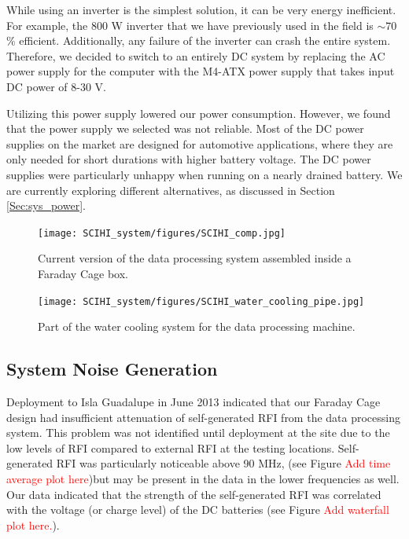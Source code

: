 While using an inverter is the simplest solution, it can be very energy inefficient. For example, the 800 W inverter that we have previously used in the field is $\sim70$\% efficient. Additionally, any failure of the inverter can crash the entire system. Therefore, we decided to switch to an entirely DC system by replacing the AC power supply for the computer with the M4-ATX power supply that takes input DC power of 8-30 V. 

Utilizing this power supply lowered our power consumption. However, we found that the power supply we selected was not reliable. Most of the DC power supplies on the market are designed for automotive applications, where they are only needed for short durations with higher battery voltage. The DC power supplies were particularly unhappy when running on a nearly drained battery. We are currently exploring different alternatives, as discussed in Section \ref{Sec:sys_power}. 

\begin{figure}[htb]
\centering
\begin{minipage}[b]{0.52\textwidth}
\centering
\texttt{[image: SCIHI\_system/figures/SCIHI\_comp.jpg]}
\caption{Current version of the data processing system assembled inside a Faraday Cage box.}
\label{Fig:new_comp}
\end{minipage}%
\begin{minipage}[b]{0.02\textwidth}
\hspace{1cm}
\end{minipage}%
\begin{minipage}[b]{0.42\textwidth}
\centering
\texttt{[image: SCIHI\_system/figures/SCIHI\_water\_cooling\_pipe.jpg]}
\caption{Part of the water cooling system for the data processing machine.}
\label{Fig:water_pipe}
\end{minipage}
\end{figure}

\subsection{System Noise Generation}
Deployment to Isla Guadalupe in June 2013 indicated that our Faraday Cage design had insufficient attenuation of self-generated RFI from the data processing system. This problem was not identified until deployment at the site due to the low levels of RFI compared to external RFI at the testing locations. Self-generated RFI was particularly noticeable above 90 MHz, (see Figure \textcolor{red}{Add time average plot here})but may be present in the data in the lower frequencies as well. Our data indicated that the strength of the self-generated RFI was correlated with the voltage (or charge level) of the DC batteries (see Figure \textcolor{red}{Add waterfall plot here.}). 


